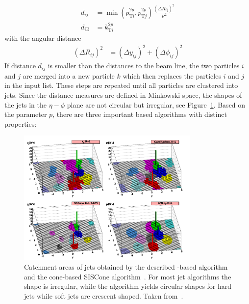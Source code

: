 \begin{align*} 
    d_{ij} &= \min(p_{\mathrm{T}i}^{2p},p_{\mathrm{T}j}^{2p})\frac{\left(\Delta
        R_{ij}\right)^2}{R^2}\\
    d_{i\mathrm{B}} &= k_{\mathrm{T}i}^{2p}
\end{align*} 
%
with the angular distance
%
\begin{align*}
    \left(\Delta R_{ij}\right)^2 &= (\Delta y_{ij})^2 + (\Delta \phi_{ij})^2
\end{align*} 
%
If distance $d_{ij}$ is smaller than the distances to the beam line, the two
particles $i$ and $j$ are merged into a new particle $k$ which then replaces the
particles $i$ and $j$ in the input list. These steps are repeated until all
particles are clustered into jets. Since the distance measures are defined in
Minkowski space, the shapes of the jets in the $\eta-\phi$ plane are not circular but
irregular, see Figure~\ref{fig:jet_shapes}. Based on the parameter $p$, there
are three important \kt based algorithms with distinct properties:

\begin{figure}[htb]
    \centering
    \includegraphics[width=0.8\textwidth]{figures/jet_reconstruction/jet_shapes.pdf}
    \caption[Jet areas of various jet algorithms]{Catchment areas of jets obtained by the described \kt-based algorithm
        and the cone-based SISCone algorithm~\cite{Salam:2009jx}. For most jet
        algorithms the shape is irregular, while the \antikt algorithm yields
        circular shapes for hard jets while soft jets are crescent shaped. Taken
        from~\cite{Berger:2014aca}.}
    \label{fig:jet_shapes}
\end{figure}

